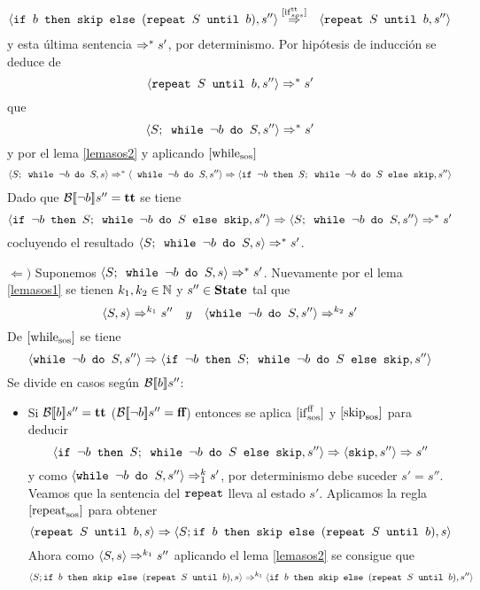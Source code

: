 \begin{example}
\begin{itemize}
\begin{eqnarray*}
        \langle \texttt{if }b\texttt{ then skip else }(\texttt{repeat }S\texttt{ until }b), s'' \rangle &\overset{[\mathrm{if}^{\mathrm{tt}}_{sos}]}{\Rightarrow}& \langle \texttt{repeat }S\texttt{ until }b, s'' \rangle
    \end{eqnarray*}
    y esta última sentencia $\Rightarrow^* s'$, por determinismo. Por hipótesis de inducción se deduce de $$\langle \texttt{repeat }S\texttt{ until }b, s'' \rangle \Rightarrow^* s'$$ que
    \[
        \langle S;\texttt{ while }\neg b\texttt{ do } S, s'' \rangle \Rightarrow^* s'
    \]
    y por el lema \ref{lemasos2} y aplicando $[\mathrm{while}_{\mathrm{sos}}]$
    \begin{eqnarray*}
        \langle S;\texttt{ while }\neg b\texttt{ do } S, s \rangle  \Rightarrow^* \langle \texttt{ while }\neg b\texttt{ do } S, s'' \rangle \Rightarrow \langle \texttt{if }\neg b\texttt{ then } S;\texttt{ while }\neg b\texttt{ do }S\texttt{ else skip}, s'' \rangle
    \end{eqnarray*}
    Dado que $\mathcal{B}[\![\neg b]\!]s'' = \textbf{tt}$ se tiene 
    \[
        \langle \texttt{if }\neg b\texttt{ then } S;\texttt{ while }\neg b\texttt{ do }S\texttt{ else skip}, s'' \rangle \Rightarrow \langle S;\texttt{ while }\neg b\texttt{ do } S, s'' \rangle \Rightarrow^* s'
    \]
    cocluyendo el resultado $\langle S;\texttt{ while }\neg b\texttt{ do } S, s \rangle \Rightarrow^* s'$.
\end{itemize}
$\Longleftarrow)$ Suponemos $\langle S;\texttt{ while }\neg b\texttt{ do } S, s \rangle \Rightarrow^* s'$. Nuevamente por el lema \ref{lemasos1} se tienen $k_1, k_2\in\mathbb{N}$ y $s''\in\textbf{State}$ tal que
\[
    \langle S, s \rangle \Rightarrow^{k_1} s''\ \ \ y\ \ \ \langle \texttt{while }\neg b\texttt{ do } S, s'' \rangle \Rightarrow^{k_2} s'
\]
De $[\mathrm{while}_{\mathrm{sos}}]$ se tiene
\[
    \langle \texttt{while }\neg b\texttt{ do } S, s'' \rangle \Rightarrow \langle \texttt{if }\neg b\texttt{ then } S;\texttt{ while }\neg b\texttt{ do }S\texttt{ else skip}, s'' \rangle
\]
Se divide en casos según $\mathcal{B}[\![b]\!]s''$:
\begin{itemize}
    \item Si $\mathcal{B}[\![b]\!]s'' = \textbf{tt}$ ($\mathcal{B}[\![\neg b]\!]s'' = \textbf{ff}$) entonces se aplica $[\mathrm{if}_{\mathrm{sos}}^{\mathrm{ff}}]$ y $[\mathrm{skip}_{\mathrm{sos}}]$ para deducir 
    \[
        \langle \texttt{if }\neg b\texttt{ then } S;\texttt{ while }\neg b\texttt{ do }S\texttt{ else skip}, s'' \rangle \Rightarrow \langle \texttt{skip}, s'' \rangle \Rightarrow s''
    \]
    y como $\langle \texttt{while }\neg b\texttt{ do } S, s'' \rangle \Rightarrow^k_1 s'$, por determinismo debe suceder $s' = s''$. Veamos que la sentencia del $\texttt{repeat}$ lleva al estado $s'$. Aplicamos la regla $[\mathrm{repeat}_{\mathrm{sos}}]$ para obtener
    \[
        \langle \texttt{repeat }S\texttt{ until }b, s \rangle \Rightarrow \langle S; \texttt{if }b\texttt{ then skip else }(\texttt{repeat }S\texttt{ until }b), s \rangle
    \]
    Ahora como $\langle S, s \rangle \Rightarrow^{k_1} s''$ aplicando el lema \ref{lemasos2} se consigue que 
    \[
        \langle S;\texttt{if }b\texttt{ then skip else }(\texttt{repeat }S\texttt{ until }b), s \rangle \Rightarrow^{k_1} \langle \texttt{if }b\texttt{ then skip else }(\texttt{repeat }S\texttt{ until }b), s'' \rangle
\]
\end{itemize}
\end{example}
